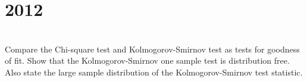 \section*{2012}
\vspace{-.5cm}
\hrulefill \smallskip\\
 Compare the Chi-square test and Kolmogorov-Smirnov test as tests for goodness of fit. Show that the Kolmogorov-Smirnov one sample test is distribution free. Also state the large sample distribution of the Kolmogorov-Smirnov test statistic.